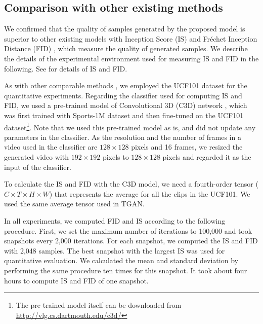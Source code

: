 \documentclass[twocolumn]{svjour3}
\begin{document}
\subsection{Comparison with other existing methods}
\label{sec:exp_comparison}
We confirmed that the quality of samples generated by the proposed model is superior to other existing models with Inception Score (IS) \cite{Salimans2016} and Fr\'echet Inception Distance (FID) \cite{Heusel2017}, which measure the quality of generated samples. We describe the details of the experimental environment used for measuring IS and FID in the following. See \cite{Borji2018} for details of IS and FID.

As with other comparable methods \cite{Saito2017,Tulyakov2018,Acharya2018},
we employed the UCF101 dataset \cite{Soomro2012} for the quantitative experiments.
Regarding the classifier used for computing IS and FID,
we used a pre-trained model of Convolutional 3D (C3D) network \cite{Tran2015},
which was first trained with Sports-1M dataset \cite{Karpathy2014}
and then fine-tuned on the UCF101 dataset\footnote{
The pre-trained model itself can be downloaded from \url{http://vlg.cs.dartmouth.edu/c3d/}}.
Note that we used this pre-trained model as is,
and did not update any parameters in the classifier.
As the resolution and the number of frames in a video used in the classifier are
$128 \times 128$ pixels and 16 frames,
we resized the generated video with $192 \times 192$ pixels to $128 \times 128$ pixels
and regarded it as the input of the classifier. 


To calculate the IS and FID with the C3D model, we need a fourth-order tensor ($C \times T \times H \times W$) that represents the average for all the clips in the UCF101.
We used the same average tensor used in TGAN.


In all experiments, we computed FID and IS according to the following procedure.
First, we set the maximum number of iterations to 100,000 and took snapshots every 2,000 iterations. For each snapshot, we computed the IS and FID with 2,048 samples.
The best snapshot with the largest IS was used for quantitative evaluation.
We calculated the mean and standard deviation by performing the same procedure ten times for this snapshot.
It took about four hours to compute IS and FID of one snapshot.
\end{document}
